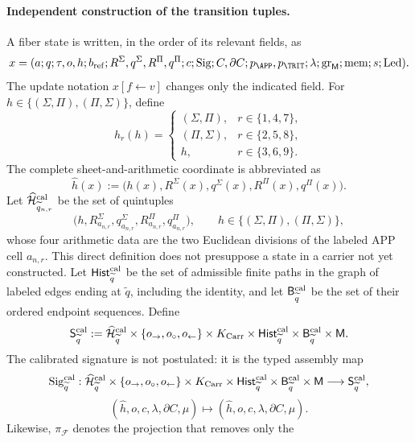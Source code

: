 \paragraph{Independent construction of the transition tuples.}
A fiber state is written, in the order of its relevant fields, as
\[
 x=(a;q;\tau,o,h;b_{\rm ref};
       R^\Sigma,q^\Sigma,R^\Pi,q^\Pi;c;
       \operatorname{Sig};C,\partial C;p_{\APP},p_{\TRIT};
       \lambda;\operatorname{gr}_{\mathsf M};\operatorname{mem};
       s;\operatorname{Led}).
\]
The update notation \(x[f\leftarrow v]\) changes only the indicated field.
For \(h\in\{(\Sigma,\Pi),(\Pi,\Sigma)\}\), define
\[
 h_r(h)=
 \begin{cases}
  (\Sigma,\Pi),&r\in\{1,4,7\},\\
  (\Pi,\Sigma),&r\in\{2,5,8\},\\
 h,&r\in\{3,6,9\}.
 \end{cases}
\]
The complete sheet-and-arithmetic coordinate is abbreviated as
\[
 \widehat h(x):=
 \bigl(h(x),R^\Sigma(x),q^\Sigma(x),R^\Pi(x),q^\Pi(x)\bigr).
\]
Let \(\widehat{\mathcal H}^{\rm cal}_{\widetilde q_{n,r}}\) be the set of
quintuples
\[
 \bigl(h,R^\Sigma_{a_{n,r}},q^\Sigma_{a_{n,r}},
          R^\Pi_{a_{n,r}},q^\Pi_{a_{n,r}}\bigr),
 \qquad
 h\in\{(\Sigma,\Pi),(\Pi,\Sigma)\},
\]
whose four arithmetic data are the two Euclidean divisions of the labeled APP
cell \(a_{n,r}\). This direct definition does not presuppose a state in a
carrier not yet constructed. Let
\(\mathsf{Hist}^{\rm cal}_{\widetilde q}\) be the set of admissible finite
paths in the graph of labeled edges ending at \(\widetilde q\), including the
identity, and let \(\mathsf B^{\rm cal}_{\widetilde q}\) be the set of their
ordered endpoint sequences. Define
\[
 \mathsf S^{\rm cal}_{\widetilde q}:=
 \widehat{\mathcal H}^{\rm cal}_{\widetilde q}
 \times\{o_{\rightarrow},o_{\circ},o_{\leftarrow}\}
 \times K_{\rm Carr}\times
 \mathsf{Hist}^{\rm cal}_{\widetilde q}\times
 \mathsf B^{\rm cal}_{\widetilde q}\times\mathsf M .
\]
The calibrated signature is not postulated: it is the typed assembly map
\[
 \operatorname{Sig}^{\rm cal}_{\widetilde q}:
 \widehat{\mathcal H}^{\rm cal}_{\widetilde q}
 \times\{o_{\rightarrow},o_{\circ},o_{\leftarrow}\}
 \times K_{\rm Carr}\times
 \mathsf{Hist}^{\rm cal}_{\widetilde q}\times
 \mathsf B^{\rm cal}_{\widetilde q}\times\mathsf M
 \longrightarrow\mathsf S^{\rm cal}_{\widetilde q},
\]
\[
 (\widehat h,o,c,\lambda,\partial C,\mu)
 \longmapsto(\widehat h,o,c,\lambda,\partial C,\mu).
\]
Likewise, \(\pi_{\mathcal F}\) denotes the projection that removes only the
